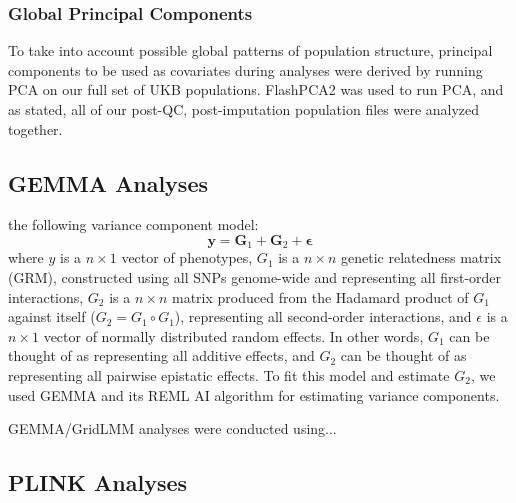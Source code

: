 \documentclass[12pt, a4paper]{article}
\begin{document}
\subsubsection{Global Principal Components}

To take into account possible global patterns of population structure, principal components to be used as covariates during analyses were derived by running PCA on our full set of UKB populations. FlashPCA2 was used to run PCA, and as stated, all of our post-QC, post-imputation population files were analyzed together.    

\subsection{GEMMA Analyses}

 the following variance component model:
\begin{equation}\label{InterPath-GEMMA-Equation-Model}
 \textbf{y} = \textbf{G}_1 + \textbf{G}_2 + \boldsymbol{\epsilon}
\end{equation}
where $y$ is a $n \times 1$ vector of phenotypes, $G_1$ is a $n \times n$ genetic relatedness matrix (GRM), constructed using all SNPs genome-wide and representing all first-order interactions, $G_2$ is a $n \times n$ matrix produced from the Hadamard product of $G_1$ against itself ($G_2 = G_1 \circ G_1$), representing all second-order interactions, and $\epsilon$ is a $n \times 1$ vector of normally distributed random effects. In other words, $G_1$ can be thought of as representing all additive effects, and $G_2$ can be thought of as representing all pairwise epistatic effects. To fit this model and estimate $G_2$, we used GEMMA \citep{Zhou2012} and its REML AI algorithm for estimating variance components.

GEMMA/GridLMM analyses were conducted using...

\subsection{PLINK Analyses}
\end{document}
